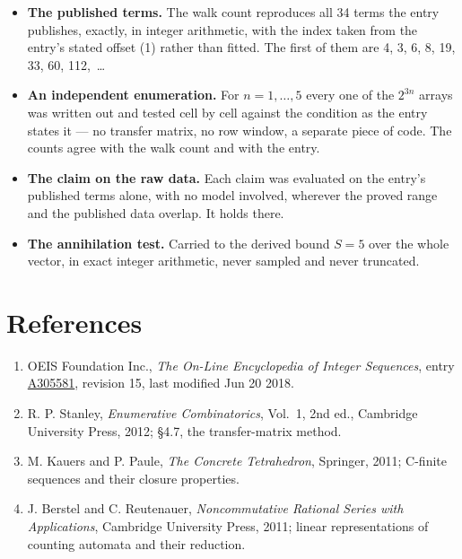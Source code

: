 \documentclass[11pt]{article}
\theoremstyle{definition}
\begin{document}
\begin{itemize}

\item {\bfseries The published terms.} The walk count reproduces all 34 terms the entry publishes, exactly, in integer arithmetic, with the index taken from the entry's stated offset (1) rather than fitted. The first of them are 4, 3, 6, 8, 19, 33, 60, 112,~\dots

\item {\bfseries An independent enumeration.} For $n = 1,\dots,5$ every one of the $2^{3n}$ arrays was written out and tested cell by cell against the condition as the entry states it --- no transfer matrix, no row window, a separate piece of code. The counts agree with the walk count and with the entry.

\item {\bfseries The claim on the raw data.} Each claim was evaluated on the entry's published terms alone, with no model involved, wherever the proved range and the published data overlap. It holds there.

\item {\bfseries The annihilation test.} Carried to the derived bound $S = 5$ over the whole vector, in exact integer arithmetic, never sampled and never truncated.

\end{itemize}

\section{References}

\begin{enumerate}

\item OEIS Foundation Inc., \emph{The On-Line Encyclopedia of Integer Sequences}, entry \href{https://oeis.org/A305581}{A305581}, revision 15, last modified Jun 20 2018.

\item R. P. Stanley, \emph{Enumerative Combinatorics}, Vol.~1, 2nd ed., Cambridge University Press, 2012; \S4.7, the transfer-matrix method.

\item M. Kauers and P. Paule, \emph{The Concrete Tetrahedron}, Springer, 2011; C-finite sequences and their closure properties.

\item J. Berstel and C. Reutenauer, \emph{Noncommutative Rational Series with Applications}, Cambridge University Press, 2011; linear representations of counting automata and their reduction.

\end{enumerate}
\end{document}
